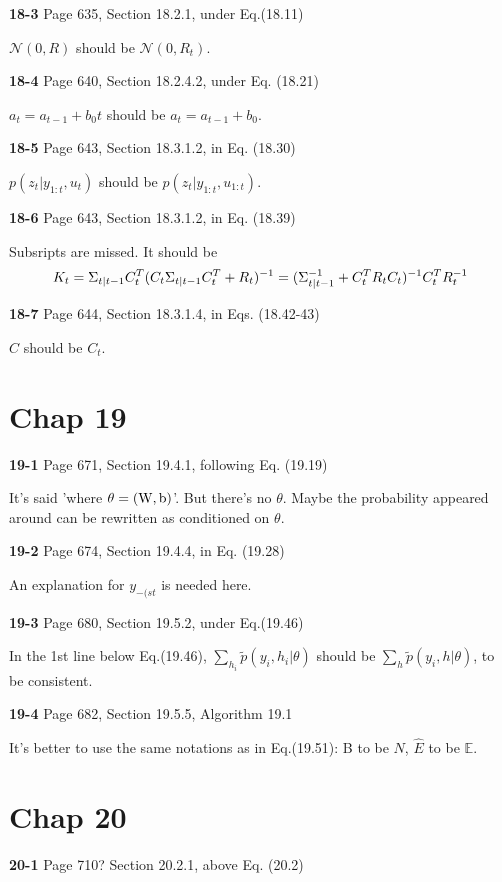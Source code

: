\documentclass[aps,preprint,a4]{revtex4-1}
\newcommand{\nl}{\nonumber \\}
\begin{document}
{\color{red}\textbf{18-3}} Page 635, Section 18.2.1, under Eq.(18.11)

$\mathcal N(0,R)$ should be $\mathcal N(0,R_{t})$.

{\color{red}\textbf{18-4}} Page 640, Section 18.2.4.2, under Eq. (18.21)

$a_{t}=a_{t-1}+b_{0}t$ should be $a_{t}=a_{t-1}+b_{0}$.

{\color{red}\textbf{18-5}} Page 643, Section 18.3.1.2, in Eq. (18.30)

$p(z_{t}|y_{1:t},u_{t})$ should be $p(z_{t}|y_{1:t},u_{1:t})$.

{\color{red}\textbf{18-6}} Page 643, Section 18.3.1.2, in Eq. (18.39)

Subsripts are missed. It should be
\begin{equation}
K_{t} = \Sigma_{t|t-1}C^{T}_{t}(C_{t}\Sigma_{t|t-1}C^{T}_{t}+R_{t})^{-1}
=(\Sigma_{t|t-1}^{-1} + C^{T}_{t}R_{t}C_{t})^{-1}C^{T}_{t}R^{-1}_{t}\nl
\end{equation}

{\color{red}\textbf{18-7}} Page 644, Section 18.3.1.4, in Eqs. (18.42-43)

$C$ should be $C_{t}$.

\section{Chap 19}
{\color{red}\textbf{19-1}} Page 671, Section 19.4.1, following Eq. (19.19)

It's said 'where $\theta=(\rm W,b)$'. But there's no $\theta$. 
Maybe the probability appeared around can be rewritten as conditioned on $\theta$.

{\color{red}\textbf{19-2}} Page 674, Section 19.4.4, in Eq. (19.28)

An explanation for $y_{-(st}$ is needed here.

{\color{red}\textbf{19-3}} Page 680, Section 19.5.2, under Eq.(19.46)

In the 1st line below  Eq.(19.46), $\sum_{h_{i}}\tilde p(y_{i},h_{i}|\theta)$ should be
$\sum_{h}\tilde p(y_{i},h|\theta)$, to be consistent.

{\color{red}\textbf{19-4}} Page 682, Section 19.5.5, Algorithm 19.1

It's better to use the same notations as in Eq.(19.51): B to be $N$, $\hat E$ to be $\mathbb E$.

\section{Chap 20}
{\color{red}\textbf{20-1}} Page 710? Section 20.2.1, above Eq. (20.2)
\end{document}
